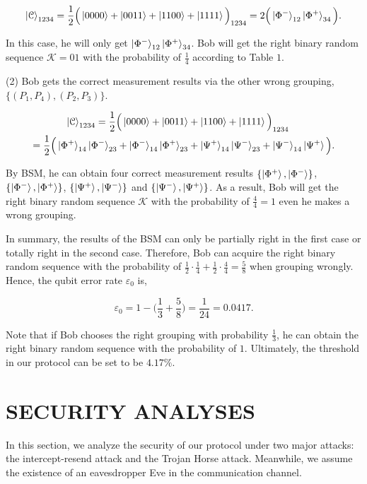 \documentclass[a4paper,11pt]{article}
\begin{document}
\begin{equation*}
\ket{\mathcal{C}}_{1234} = \dfrac{1}{2} \Big(\ket{0000} + \ket{0011}
 + \ket{1100} + \ket{1111} \Big)_{1234} = 2 \Big(\ket{\Phi^-}_{12} \ket{\Phi^+}_{34}\Big).
\end{equation*}

In this case, he will only get $\ket{\Phi^-}_{12} \ket{\Phi^+}_{34}$. Bob will get the right binary random sequence $\mathcal{K} = 01$ with the probability of $\frac{1}{4}$ according to Table $1$.

(2) Bob gets the correct measurement results via the other wrong grouping, $\{(P_1, P_4), (P_2, P_3)\}$.

\begin{align*}
\ket{\mathcal{C}}_{1234} = \dfrac{1}{2} \Big(\ket{0000} + \ket{0011}
&+ \ket{1100} + \ket{1111} \Big)_{1234} \nonumber\\
 = \dfrac{1}{2} \Big(
\ket{\Phi^+}_{14} \ket{\Phi^-}_{23} + \ket{\Phi^-}_{14} \ket{\Phi^+}_{23} &+ 
\ket{\Psi^+}_{14} \ket{\Psi^-}_{23} + \ket{\Psi^-}_{14} \ket{\Psi^+} \Big).
\end{align*}

By BSM, he can obtain four correct measurement results $\{\ket{\Phi^+}, \ket{\Phi^-}\}$, $\{\ket{\Phi^-}, \ket{\Phi^+}\}$, $\{\ket{\Psi^+}, \ket{\Psi^-}\}$ and $\{\ket{\Psi^-}, \ket{\Psi^+}\}$. As a result, Bob will get the right binary random sequence $\mathcal{K}$ with the probability of $\frac{4}{4} = 1$ even he makes a wrong grouping.

In summary, the results of the BSM can only be partially right in the first case or totally right in the second case. Therefore, Bob can acquire the right binary random sequence
with the probability of $\frac{1}{2} \cdot \frac{1}{4} + \frac{1}{2} \cdot \frac{4}{4} = \frac{5}{8}$ when grouping wrongly. Hence, the qubit error rate $\varepsilon_0$ is,

\begin{equation*}
\varepsilon_0 = 1 - \Big(\dfrac{1}{3} + \dfrac{5}{8}\Big) = \dfrac{1}{24} = 0.0417.
\end{equation*}

Note that if Bob chooses the right grouping with probability $\frac{1}{3}$, he can obtain the right binary random sequence with the probability of $1$. Ultimately, the threshold in our protocol can be set to be $4.17\%$.

\section{SECURITY ANALYSES}
In this section, we analyze the security of our protocol under two major attacks: the intercept-resend attack and the Trojan Horse attack. Meanwhile, we assume the existence of
an eavesdropper Eve in the communication channel.
\end{document}
